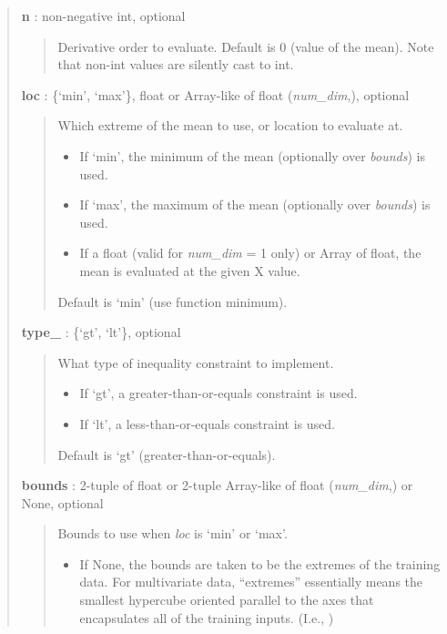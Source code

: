\documentclass[letterpaper,10pt,english]{sphinxmanual}
\begin{document}
\begin{fulllineitems}
\begin{quote}
\begin{description}
\textbf{n} : non-negative int, optional
\begin{quote}

Derivative order to evaluate. Default is 0 (value of the mean). Note
that non-int values are silently cast to int.
\end{quote}

\textbf{loc} : \{`min', `max'\}, float or Array-like of float (\emph{num\_dim},), optional
\begin{quote}

Which extreme of the mean to use, or location to evaluate at.
\begin{itemize}
\item {} 
If `min', the minimum of the mean (optionally over \emph{bounds}) is used.

\item {} 
If `max', the maximum of the mean (optionally over \emph{bounds}) is used.

\item {} 
If a float (valid for \emph{num\_dim} = 1 only) or Array of float, the mean
is evaluated at the given X value.

\end{itemize}

Default is `min' (use function minimum).
\end{quote}

\textbf{type\_} : \{`gt', `lt'\}, optional
\begin{quote}

What type of inequality constraint to implement.
\begin{itemize}
\item {} 
If `gt', a greater-than-or-equals constraint is used.

\item {} 
If `lt', a less-than-or-equals constraint is used.

\end{itemize}

Default is `gt' (greater-than-or-equals).
\end{quote}

\textbf{bounds} : 2-tuple of float or 2-tuple Array-like of float (\emph{num\_dim},) or None, optional
\begin{quote}

Bounds to use when \emph{loc} is `min' or `max'.
\begin{itemize}
\item {} 
If None, the bounds are taken to be the extremes of the training data.
For multivariate data, ``extremes'' essentially means the smallest
hypercube oriented parallel to the axes that encapsulates all of the
training inputs. (I.e., )


\end{itemize}
\end{quote}
\end{description}
\end{quote}
\end{fulllineitems}
\end{document}
